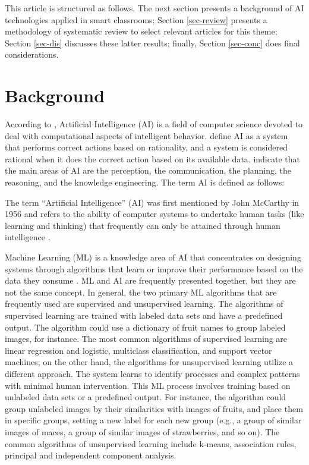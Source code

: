 \documentclass[english]{textolivre}
\begin{document}
This article is structured as follows. The next section presents a
background of AI technologies applied in smart classrooms; Section \ref{sec-review}
presents a methodology of systematic review to select relevant articles
for this theme; Section \ref{sec-dis} discusses these latter results; finally,
Section \ref{sec-conc} does final considerations.


\section{Background}\label{sec-back}
According to \textcite{Shapiro2003}, Artificial Intelligence (AI) is a field of
computer science devoted to deal with computational aspects of
intelligent behavior. \textcite[p.~37]{Russel2021} define AI as a
system that performs correct actions based on rationality, and a system
is considered rational when it does the correct action based on its
available data. \textcite{Zhang2021} indicate that the main areas of
AI are the perception, the communication, the planning, the reasoning,
and the knowledge engineering. The term AI is defined as follows:

The term ``Artificial Intelligence'' (AI) was first mentioned by John
McCarthy in 1956 and refers to the ability of computer systems to
undertake human tasks (like learning and thinking) that frequently can
only be attained through human intelligence
\cite[p.~2]{Dimitriadou2023}.

Machine Learning (ML) is a knowledge area of AI that concentrates on
designing systems through algorithms that learn or improve their
performance based on the data they consume
\cite{Oracle2024, Eglite2022}. ML and AI are frequently presented
together, but they are not the same concept. In general, the two primary
ML algorithms that are frequently used are supervised and unsupervised
learning. The algorithms of supervised learning are trained with labeled
data sets and have a predefined output. The algorithm could use a
dictionary of fruit names to group labeled images, for instance. The
most common algorithms of supervised learning are linear regression and
logistic, multiclass classification, and support vector machines; on the
other hand, the algorithms for unsupervised learning utilize a different
approach. The system learns to identify processes and complex patterns
with minimal human intervention. This ML process involves training based
on unlabeled data sets or a predefined output. For instance, the
algorithm could group unlabeled images by their similarities with images
of fruits, and place them in specific groups, setting a new label for
each new group (e.g., a group of similar images of maces, a group of
similar images of strawberries, and so on). The common algorithms of
unsupervised learning include k-means, association rules, principal and
independent component analysis.
\end{document}
